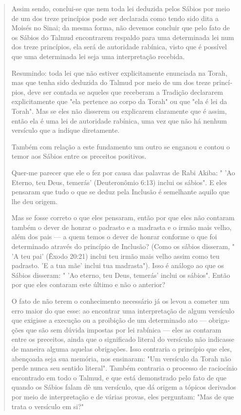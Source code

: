 \begin{quote}
Assim sendo, conclui-se que nem toda lei deduzida pelos Sábios por meio
de um dos treze princípios pode ser declarada como tendo sido dita a
Moisés no Sinai; da mesma forma, não devemos concluir que pelo fato de
os Sábios do Talmud encontrarem respaldo para uma determinada lei num
dos treze princípios, ela será de autoridade rabínica, visto que é
possível que uma
determinada lei seja uma interpretação recebida.

Resumindo: toda lei que não estiver explicitamente enunciada na To­rah,
mas que tenha sido deduzida do Talmud por meio de um dos treze
princí­pios, deve ser contada se aqueles que receberam a Tradição
declararem expli­citamente que "ela pertence ao corpo da Torah" ou que
"ela é lei da Torah". Mas se eles não disserem ou explicarem claramente
que é assim, então ela é uma lei de autoridade rabínica, uma vez que não
há nenhum versículo que a indique diretamente.

Também com relação a este fundamento um outro se enganou e con­tou o
temor aos Sábios entre os preceitos positivos.

Quer-me parecer que ele o fez por causa das palavras de Rabi Akiba: "
'Ao Eterno, teu Deus, temerás' (Deuteronômio 6:13) inclui os sábios". E
eles pensaram que tudo o que se deduz pela Inclusão é semelhante aquilo
que lhe deu origem.

Mas se fosse correto o que eles pensaram, então por que eles não
contaram também o dever de honrar o padrasto e a madrasta e o irmão mais
velho, além dos pais --- a quem temos o dever de honrar conforme o que
foi determinado através do princípio de Inclusão? (Como os sábios
disseram, " 'A teu pai' (Êxodo 20:21) inclui teu irmão mais velho assim
como teu padrasto. 'E a tua mãe' inclui tua madrasta"). Isso é análogo
ao que os Sábios disseram: " 'Ao eterno, teu Deus, temerás' inclui os
sábios". Então por que eles conta­ram este último e não o anterior?

O fato de não terem o conhecimento necessário já os levou a come­ter um
erro maior do que esse: ao encontrar uma interpretação de algum
versí­culo que exigisse a execução ou a proibição de um determinado ato
--- obriga­ções que são sem dúvida impostas por lei rabínica --- eles as
contaram entre os preceitos, ainda que o significado literal do
versículo não indicasse de ma­neira alguma aquelas obrigações. Isso
contraria o princípio que eles, abençoa­da seja sua memória, nos
ensinaram: "Um versículo da Torah não perde nunca seu sentido literal".
Também contraria o processo de raciocínio encontrado em todo o Talmud, e
que está demonstrado pelo fato de que quando os Sábios falam dè um
versículo, que dá origem a tópicos derivados por meio de inter­pretação
e de várias provas, eles perguntam: "Mas de que trata o versículo em
si?"


\end{quote}
